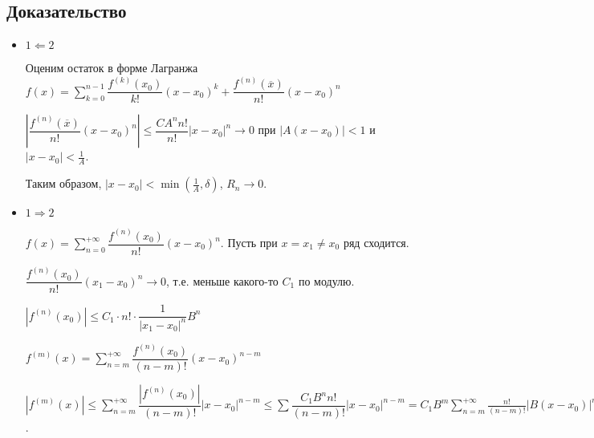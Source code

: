 \documentclass{article}
\begin{document}
        \subsection{Доказательство}
        
            \begin{itemize}
            
                \item $1 \Leftarrow 2$
                
                    Оценим остаток в форме Лагранжа $f(x) = \sum\limits^{n - 1}_{k = 0} \dfrac{f^{(k)}(x_0)}{k!} (x - x_0)^k + \dfrac{f^{(n)}(\overline{x})}{n!} (x - x_0)^n$
                    
                    $\left| \dfrac{f^{(n)}(\overline{x})}{n!} (x - x_0)^n \right| \leqslant \dfrac{C A^n n!}{n!} |x - x_0|^n \rightarrow 0$ при $|A(x - x_0)| < 1$ и $|x - x_0| < \frac{1}{A}$. 
                    
                    Таким образом, $|x - x_0| < \min \left( \frac{1}{A}, \delta \right)$, $R_n \rightarrow 0$.
                    
                \item $1 \Rightarrow 2$
                
                    $f(x) = \sum\limits^{+\infty}_{n = 0} \dfrac{f^{(n)}(x_0)}{n!} (x - x_0)^n$. Пусть при $x = x_1 \neq x_0$ ряд сходится.
                    
                    $\dfrac{f^{(n)}(x_0)}{n!} (x_1 - x_0)^n \rightarrow 0$, т.е. меньше какого-то $C_1$ по модулю.
                    
                    $\left| f^{(n)}(x_0) \right| \leqslant C_1 \cdot n! \cdot \dfrac{1}{| x_1 - x_0 |^n} B^n$
                    
                    $f^{(m)}(x) = \sum\limits^{+\infty}_{n = m} \dfrac{f^{(n)}(x_0)}{(n - m)!} (x - x_0)^{n - m}$
                    
                    $\left| f^{(m)}(x) \right| \leqslant \sum\limits^{+\infty}_{n = m} \dfrac{|f^{(n)}(x_0)|}{(n - m)!} |x - x_0|^{n - m} \leqslant \sum \dfrac{C_1 B^n n!}{(n - m)!} |x - x_0|^{n - m} = C_1 B^m \sum\limits^{+\infty}_{n = m} \frac{n!}{(n - m)!} \left| B(x - x_0) \right|^{n - m} = C_1 \cdot \dfrac{m! B^m}{| 1 - \left( B(x - x_0) \right)} \leqslant C_1 m! B^m 2^{m + 1} = (2 C_1) m! (2 B)^m$.
                    
            \end{itemize}
            
\end{document}
